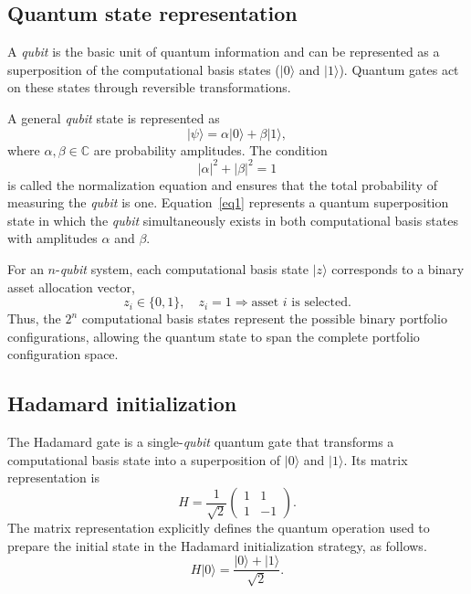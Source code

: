 \documentclass[runningheads]{llncs}
\begin{document}
\subsection{Quantum state representation}

A \emph{qubit} is the basic unit of quantum information and can be represented as a superposition of the computational basis states ($|0\rangle$ and $|1\rangle$). Quantum gates act on these states through reversible transformations.

A general \emph{qubit} state is represented as
\begin{equation}\label{eq1}
    |\psi\rangle = \alpha|0\rangle + \beta|1\rangle,
\end{equation}
where $\alpha,\beta \in \mathbb{C}$ are probability amplitudes. The condition
\begin{equation}
    |\alpha|^2 + |\beta|^2 = 1
\end{equation}
is called the normalization equation and ensures that the total probability of measuring the \emph{qubit} is one. Equation~\ref{eq1} represents a quantum superposition state in which the \emph{qubit} simultaneously exists in both computational basis states with amplitudes $\alpha$ and $\beta$.
 
 For an $n$-\emph{qubit} system, each computational basis state $|z\rangle$ corresponds to a binary asset allocation vector,
\begin{equation}
    z_i \in \{0,1\}, \quad z_i = 1 \Rightarrow
    \text{asset } i \text{ is selected}.
\end{equation}
Thus, the $2^n$ computational basis states represent the possible binary portfolio configurations, allowing the quantum state to span the complete portfolio configuration space.

\subsection{Hadamard initialization}

The Hadamard gate is a single-\emph{qubit} quantum gate that transforms a computational basis state into a superposition of $|0\rangle$ and $|1\rangle$. Its matrix representation is
\begin{equation}
    H = \frac{1}{\sqrt{2}}
    \begin{pmatrix}
        1 & 1 \\
        1 & -1
    \end{pmatrix}.
\end{equation}
The matrix representation explicitly defines the quantum operation used to prepare the initial state in the Hadamard initialization strategy, as follows.
\begin{equation}
    H|0\rangle =
    \frac{|0\rangle + |1\rangle}{\sqrt{2}}.
\end{equation}
\end{document}
